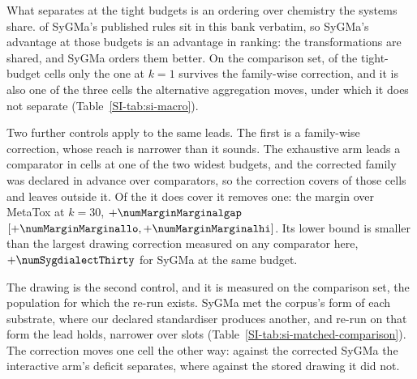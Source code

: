 What separates at the tight budgets is an ordering over chemistry the systems share.
\numSygmaInside{} of SyGMa's \numSygmaRules{} published rules sit in this bank verbatim, so SyGMa's advantage
at those budgets is an advantage in ranking: the transformations are shared, and SyGMa orders them
better. On the
comparison set, of the tight-budget cells only the one at $k=1$ survives the family-wise
correction, and it is also one of the three cells the alternative aggregation moves, under which
it does not separate (Table~\ref{SI-tab:si-macro}).

Two further controls apply to the same leads. The first is a family-wise correction, whose reach
is narrower than it sounds. The exhaustive arm leads a comparator in \numSweepWideleadsWord{} cells
at one of the two widest budgets, and the corrected family was declared in advance over
\numSweepFamilycomparatorsWord{} comparators, so the correction covers
\numSweepWideleadsinfamilyWord{} of those cells and leaves \numSweepWideleadsoutsideWord{} outside
it. Of the \numSweepWideleadsinfamilyWord{} it does
cover it removes one: the margin over MetaTox at $k=30$, $+\numMarginMarginalgap$
$[+\numMarginMarginallo, +\numMarginMarginalhi]$. Its lower bound is smaller than the largest
drawing correction measured on any comparator here, $+\numSygdialectThirty$ for SyGMa at the same
budget.

The drawing is the second control, and it is measured on the comparison set, the population
for which the re-run exists. SyGMa met the corpus's form of each substrate, where our declared
standardiser produces another, and re-run on that form the lead holds,
\numMatchedSygmadrawingcost{} narrower over \numMatchedBanksygmastdSlots{} slots
(Table~\ref{SI-tab:si-matched-comparison}). The correction moves one cell the other way: against the corrected
SyGMa the interactive arm's deficit separates, where against the stored drawing it did not.

